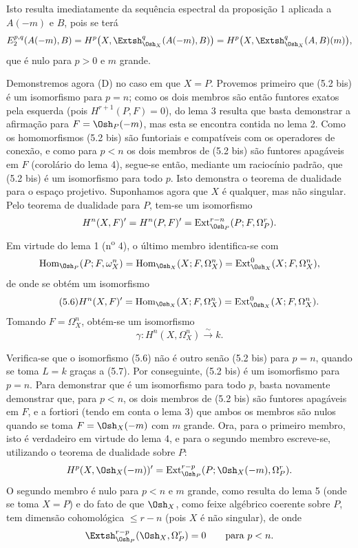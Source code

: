 Isto resulta imediatamente da sequência espectral da proposição 1 aplicada a
$A(-m)$ e $B$, pois se terá
\[
  E_{2}^{p,q}(A(-m),B)
  =H^{p}\bigl(X,\Extsh_{\Osh_X}^{q}(A(-m),B)\bigr)
  =H^{p}\bigl(X,\Extsh_{\Osh_X}^{q}(A,B)(m)\bigr),
\]
que é nulo para $p>0$ e $m$ grande.

Demonstremos agora (D) no caso em que $X=P$. Provemos primeiro que (5.2 bis)
é um isomorfismo para $p=n$; como os dois membros são então
funtores exatos pela esquerda (pois $H^{r+1}(P,F)=0$), do lema 3 resulta
que basta demonstrar a afirmação para $F=\Osh_P(-m)$, mas esta se encontra
contida no lema 2. Como os homomorfismos (5.2 bis) são funtoriais e
compatíveis com os operadores de conexão, e como para $p<n$ os dois membros de
(5.2 bis) são funtores apagáveis em $F$ (corolário do lema 4), segue-se
então, mediante um raciocínio padrão, que (5.2 bis) é um isomorfismo
para todo $p$. Isto demonstra o teorema de dualidade para o espaço projetivo.
Suponhamos agora que $X$ é qualquer, mas não singular. Pelo teorema de
dualidade para $P$, tem-se um isomorfismo
\[
  H^{n}(X,F)'=H^{n}(P,F)'
  =\operatorname{Ext}_{\Osh_P}^{r-n}(P;F,\Omega_P^{r}).
\]
Em virtude do lema 1 (n\textsuperscript{o} 4), o último membro identifica-se com
\[
  \operatorname{Hom}_{\Osh_P}(P;F,\omega_X^{n})
  =\operatorname{Hom}_{\Osh_X}(X;F,\Omega_X^{n})
  =\operatorname{Ext}_{\Osh_X}^{0}(X;F,\Omega_X^{n}),
\]
de onde se obtém um isomorfismo
\begin{equation}\tag{5.6}
  H^{n}(X,F)'=\operatorname{Hom}_{\Osh_X}(X;F,\Omega_X^{n})
  =\operatorname{Ext}_{\Osh_X}^{0}(X;F,\Omega_X^{n}).
\end{equation}
Tomando $F=\Omega_X^{n}$, obtém-se um isomorfismo
\begin{equation}\tag{5.7}
  \gamma:H^{n}(X,\Omega_X^{n})\xrightarrow{\sim}k.
\end{equation}

Verifica-se que o isomorfismo (5.6) não é outro senão (5.2 bis) para $p=n$, quando
se toma $L=k$ graças a (5.7). Por conseguinte, (5.2 bis) é um isomorfismo para
$p=n$. Para demonstrar que é um isomorfismo para todo $p$, basta novamente
demonstrar que, para $p<n$, os dois membros de (5.2 bis) são funtores
apagáveis em $F$, e a fortiori (tendo em conta o lema 3) que ambos os membros
são nulos quando se toma $F=\Osh_X(-m)$ com $m$ grande. Ora, para o primeiro
membro, isto é verdadeiro em virtude do lema 4, e para o segundo membro escreve-se,
utilizando o teorema de dualidade sobre $P$:
\[
  H^{p}(X,\Osh_X(-m))'
  =\operatorname{Ext}_{\Osh_P}^{r-p}
    (P;\Osh_X(-m),\Omega_P^{r}).
\]
O segundo membro é nulo para $p<n$ e $m$ grande, como resulta do lema 5
(onde se toma $X=P$) e do fato de que $\Osh_X$, como feixe algébrico
coerente sobre $P$, tem dimensão cohomológica $\leq r-n$ (pois $X$ é não
singular), de onde
\[
  \Extsh_{\Osh_P}^{r-p}(\Osh_X,\Omega_P^{r})=0
  \qquad\text{para }p<n.
\]

